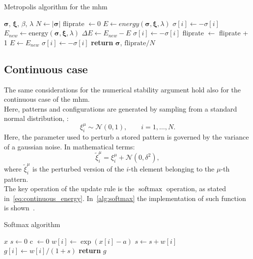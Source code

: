 \documentclass[\rootdir/main.tex]{subfiles}
\begin{document}
\begin{algorithm}
    \caption{Metropolis algorithm for the \acrlong{mhm}}
    \label{alg:mhm_metropolis}
    \begin{algorithmic}[1]
    \Require $\symbf{\sigma}$, $\symbf{\xi}$, $\beta$, $\lambda$
        \State $N \gets |\symbf{\sigma}|$ 
        \State fliprate $\gets 0$
        \State $E \gets energy\left(\symbf{\sigma}, \symbf{\xi}, \lambda\right)$
        \State $\sigma[i] \gets - \sigma[i]$
        \State $E_{new} \gets \text{energy}\left(\symbf{\sigma}, \symbf{\xi}, \lambda\right)$
        \State $\Delta E \gets E_{new} - E$
            \State $\sigma[i] \gets - \sigma[i]$
            \State fliprate $\gets$ fliprate + 1
            \State $E \gets E_{new}$
        \Else
            \State $\sigma[i] \gets - \sigma[i]$
        \EndIf
        \EndFor
    \State \textbf{return} $\symbf{\sigma}$, $\text{fliprate} / N$
    \end{algorithmic}
\end{algorithm}

\subsection{Continuous case}\label{sec:numsim_continuous}
The same considerations for the numerical stability argument hold also for the continuous case of the \acrlong{mhm}.\\
Here, patterns and configurations are generated by sampling from a standard normal distribution, \ie:
\begin{equation*}
    \xi_i^{\mu} \sim \mathcal{N}\left(0, 1\right), \qquad i = 1, \dots, N.
\end{equation*}
Here, the parameter used to perturb a stored pattern is governed by the variance of a gaussian noise. In mathematical terms:
\begin{equation*}
    \tilde{\xi}_i^{\mu} = \xi_i^{\mu} + \mathcal{N}\left(0, \delta^2\right),
\end{equation*}
where $\tilde{\xi}_i^{\mu}$ is the perturbed version of the $i$-th element belonging to the $\mu$-th pattern.\\
The key operation of the update rule is the $\operatorname{softmax}$ operation, as stated in~\cref{eq:continuous_energy}. In~\cref{alg:softmax} the implementation of such function is shown~\cite{numerically_stable}.

\begin{algorithm}
    \caption{Softmax algorithm}
    \label{alg:softmax}
    \begin{algorithmic}[1]
    \Require $x$
    \State $s \gets 0$
    \State c $\gets 0$
        \State $w[i] \gets \exp\left(x[i] - a\right)$
            \State $s \gets s + w[i]$
        \EndIf
    \EndFor
        \State $g[i] \gets w[i]/(1+s)$
    \EndFor
    \State \textbf{return} $g$
\end{algorithmic}
\end{algorithm}
\end{document}
